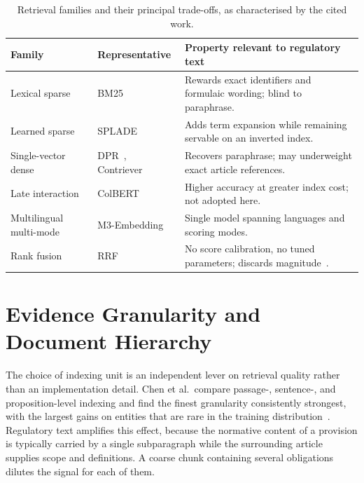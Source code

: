 \begin{table}[htbp]
  \centering
  \caption{Retrieval families and their principal trade-offs, as characterised by the cited work.}
  \label{tab:retrieval-families}
  \small
  \begin{tabularx}{\textwidth}{@{}l l X@{}}
    \toprule
    \textbf{Family} & \textbf{Representative} & \textbf{Property relevant to regulatory text} \\
    \midrule
    Lexical sparse & BM25~\cite{robertson2009bm25} & Rewards exact identifiers and formulaic wording; blind to paraphrase. \\
    Learned sparse & SPLADE~\cite{formal2021splade} & Adds term expansion while remaining servable on an inverted index. \\
    Single-vector dense & DPR~\cite{karpukhin2020dpr}, Contriever~\cite{izacard2022contriever} & Recovers paraphrase; may underweight exact article references. \\
    Late interaction & ColBERT~\cite{khattab2020colbert,santhanam2022colbertv2} & Higher accuracy at greater index cost; not adopted here. \\
    Multilingual multi-mode & M3-Embedding~\cite{chen2024m3embedding} & Single model spanning languages and scoring modes. \\
    Rank fusion & \ac{RRF}~\cite{cormack2009rrf} & No score calibration, no tuned parameters; discards magnitude~\cite{bruch2024fusion}. \\
    \bottomrule
  \end{tabularx}
\end{table}

\section{Evidence Granularity and Document Hierarchy}
\label{sec:sota-granularity}

The choice of indexing unit is an independent lever on retrieval quality rather than an implementation detail. Chen et al.\ compare passage-, sentence-, and proposition-level indexing and find the finest granularity consistently strongest, with the largest gains on entities that are rare in the training distribution~\cite{chen2024densex}. Regulatory text amplifies this effect, because the normative content of a provision is typically carried by a single subparagraph while the surrounding article supplies scope and definitions. A coarse chunk containing several obligations dilutes the signal for each of them.

